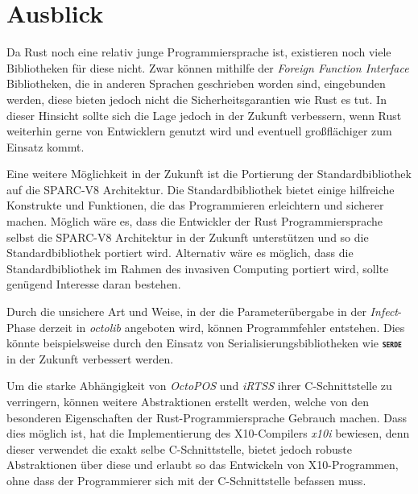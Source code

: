 \section{Ausblick}

Da Rust noch eine relativ junge Programmiersprache ist, existieren noch viele Bibliotheken für diese nicht.
Zwar können mithilfe der \textit{Foreign Function Interface} Bibliotheken,
die in anderen Sprachen geschrieben worden sind, eingebunden werden, diese bieten jedoch
nicht die Sicherheitsgarantien wie Rust es tut.
In dieser Hinsicht sollte sich die Lage jedoch in der Zukunft verbessern, wenn Rust
weiterhin gerne von Entwicklern genutzt wird und eventuell großflächiger zum Einsatz kommt.

Eine weitere Möglichkeit in der Zukunft ist die Portierung der Standardbibliothek auf die SPARC-V8 Architektur.
Die Standardbibliothek bietet einige hilfreiche Konstrukte und Funktionen,
die das Programmieren erleichtern und sicherer machen.
Möglich wäre es, dass die Entwickler der Rust Programmiersprache selbst die SPARC-V8 Architektur
in der Zukunft unterstützen und so die Standardbibliothek portiert wird. Alternativ wäre es möglich, dass die 
Standardbibliothek im Rahmen des invasiven Computing portiert wird, sollte genügend Interesse daran bestehen.

Durch die unsichere Art und Weise, in der die Parameterübergabe in der \textit{Infect}-Phase derzeit in
\textit{octolib} angeboten wird, können Programmfehler entstehen. Dies könnte beispielsweise durch den Einsatz von
Serialisierungsbibliotheken wie \texttt{\textsc{\textbf{serde}}} in der Zukunft verbessert werden.

Um die starke Abhängigkeit von \textit{OctoPOS} und \textit{iRTSS} ihrer C-Schnittstelle zu verringern,
können weitere Abstraktionen erstellt werden, welche von den
besonderen Eigenschaften der Rust-Programmiersprache Gebrauch machen.
Dass dies möglich ist, hat die Implementierung des X10-Compilers \textit{x10i} bewiesen,
denn dieser verwendet die exakt selbe C-Schnittstelle,
bietet jedoch robuste Abstraktionen über diese und erlaubt so
das Entwickeln von X10-Programmen, ohne dass der Programmierer sich mit der C-Schnittstelle befassen muss.

